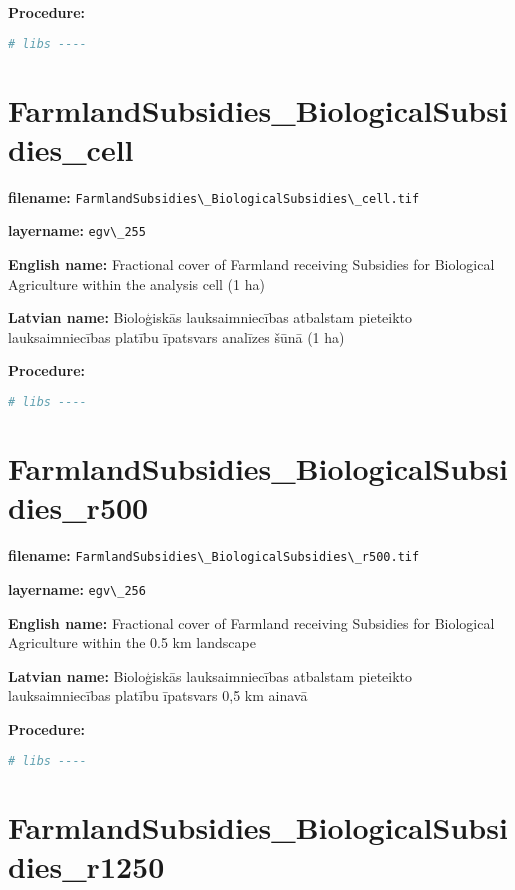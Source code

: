 \documentclass[
]{book}
\newcommand{\passthrough}[1]{#1}
\begin{document}
\textbf{Procedure:}

\begin{lstlisting}[language=R]
# libs ----
\end{lstlisting}

\section{FarmlandSubsidies\_BiologicalSubsidies\_cell}\label{ch06.255}

\textbf{filename:} \passthrough{\lstinline!FarmlandSubsidies\_BiologicalSubsidies\_cell.tif!}

\textbf{layername:} \passthrough{\lstinline!egv\_255!}

\textbf{English name:} Fractional cover of Farmland receiving Subsidies for Biological Agriculture within the analysis cell (1 ha)

\textbf{Latvian name:} Bioloģiskās lauksaimniecības atbalstam pieteikto lauksaimniecības platību īpatsvars analīzes šūnā (1 ha)

\textbf{Procedure:}

\begin{lstlisting}[language=R]
# libs ----
\end{lstlisting}

\section{FarmlandSubsidies\_BiologicalSubsidies\_r500}\label{ch06.256}

\textbf{filename:} \passthrough{\lstinline!FarmlandSubsidies\_BiologicalSubsidies\_r500.tif!}

\textbf{layername:} \passthrough{\lstinline!egv\_256!}

\textbf{English name:} Fractional cover of Farmland receiving Subsidies for Biological Agriculture within the 0.5 km landscape

\textbf{Latvian name:} Bioloģiskās lauksaimniecības atbalstam pieteikto lauksaimniecības platību īpatsvars 0,5 km ainavā

\textbf{Procedure:}

\begin{lstlisting}[language=R]
# libs ----
\end{lstlisting}

\section{FarmlandSubsidies\_BiologicalSubsidies\_r1250}\label{ch06.257}
\end{document}
